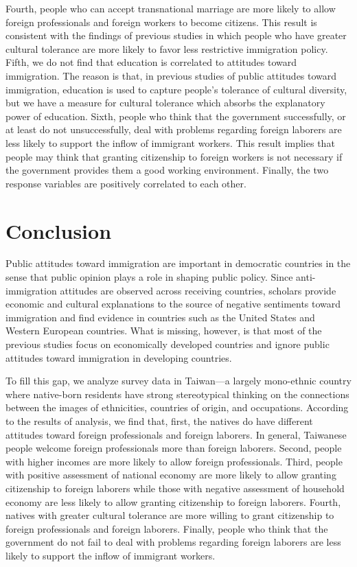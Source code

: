 \documentclass[12pt]{article}
\begin{document}
Fourth, people who can accept transnational marriage are more likely to allow foreign professionals and foreign workers to become citizens. This result is consistent with the findings of previous studies in which people who have greater cultural tolerance are more likely to favor less restrictive immigration policy. Fifth, we do not find that education is correlated to attitudes toward immigration. The reason is that, in previous studies of public attitudes toward immigration, education is used to capture people's tolerance of cultural diversity, but we have a measure for cultural tolerance which absorbs the explanatory power of education. Sixth, people who think that the government successfully, or at least do not unsuccessfully, deal with problems regarding foreign laborers are less likely to support the inflow of immigrant workers. This result implies that people may think that granting citizenship to foreign workers is not necessary if the government provides them a good working environment. Finally, the two response variables are positively correlated to each other.



\section{Conclusion}


Public attitudes toward immigration are important in democratic countries in the sense that public opinion plays a role in shaping public policy. Since anti-immigration attitudes are observed across receiving countries, scholars provide economic and cultural explanations to the source of negative sentiments toward immigration and find evidence in countries such as the United States and Western European countries. What is missing, however, is that most of the previous studies focus on economically developed countries and ignore public attitudes toward immigration in developing countries.


To fill this gap, we analyze survey data in Taiwan---a largely mono-ethnic country where native-born residents have strong stereotypical thinking on the connections between the images of ethnicities, countries of origin, and occupations. According to the results of analysis, we find that, first, the natives do have different attitudes toward foreign professionals and foreign laborers. In general, Taiwanese people welcome foreign professionals more than foreign laborers. Second, people with higher incomes are more likely to allow foreign professionals. Third, people with positive assessment of national economy are more likely to allow granting citizenship to foreign laborers while those with negative assessment of household economy are less likely to allow granting citizenship to foreign laborers. Fourth, natives with greater cultural tolerance are more willing to grant citizenship to foreign professionals and foreign laborers. Finally, people who think that the government do not fail to deal with problems regarding foreign laborers are less likely to support the inflow of immigrant workers.
\end{document}
